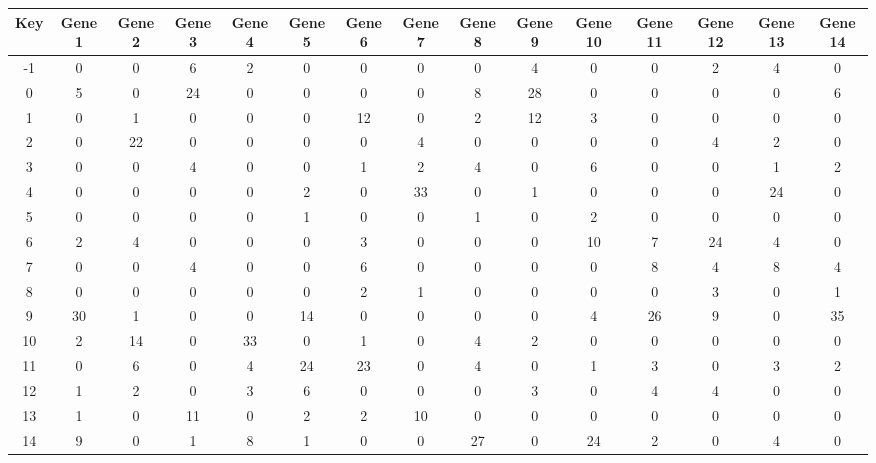 \begin{tabular}{|c|c|c|c|c|c|c|c|c|c|c|c|c|c|c|}
\hline
Key & Gene 1 & Gene 2 & Gene 3 & Gene 4 & Gene 5 & Gene 6 & Gene 7 & Gene 8 & Gene 9 & Gene 10 & Gene 11 & Gene 12 & Gene 13 & Gene 14 \\
\hline
-1 & 0 & 0 & 6 & 2 & 0 & 0 & 0 & 0 & 4 & 0 & 0 & 2 & 4 & 0 \\
0 & 5 & 0 & 24 & 0 & 0 & 0 & 0 & 8 & 28 & 0 & 0 & 0 & 0 & 6 \\
1 & 0 & 1 & 0 & 0 & 0 & 12 & 0 & 2 & 12 & 3 & 0 & 0 & 0 & 0 \\
2 & 0 & 22 & 0 & 0 & 0 & 0 & 4 & 0 & 0 & 0 & 0 & 4 & 2 & 0 \\
3 & 0 & 0 & 4 & 0 & 0 & 1 & 2 & 4 & 0 & 6 & 0 & 0 & 1 & 2 \\
4 & 0 & 0 & 0 & 0 & 2 & 0 & 33 & 0 & 1 & 0 & 0 & 0 & 24 & 0 \\
5 & 0 & 0 & 0 & 0 & 1 & 0 & 0 & 1 & 0 & 2 & 0 & 0 & 0 & 0 \\
6 & 2 & 4 & 0 & 0 & 0 & 3 & 0 & 0 & 0 & 10 & 7 & 24 & 4 & 0 \\
7 & 0 & 0 & 4 & 0 & 0 & 6 & 0 & 0 & 0 & 0 & 8 & 4 & 8 & 4 \\
8 & 0 & 0 & 0 & 0 & 0 & 2 & 1 & 0 & 0 & 0 & 0 & 3 & 0 & 1 \\
9 & 30 & 1 & 0 & 0 & 14 & 0 & 0 & 0 & 0 & 4 & 26 & 9 & 0 & 35 \\
10 & 2 & 14 & 0 & 33 & 0 & 1 & 0 & 4 & 2 & 0 & 0 & 0 & 0 & 0 \\
11 & 0 & 6 & 0 & 4 & 24 & 23 & 0 & 4 & 0 & 1 & 3 & 0 & 3 & 2 \\
12 & 1 & 2 & 0 & 3 & 6 & 0 & 0 & 0 & 3 & 0 & 4 & 4 & 0 & 0 \\
13 & 1 & 0 & 11 & 0 & 2 & 2 & 10 & 0 & 0 & 0 & 0 & 0 & 0 & 0 \\
14 & 9 & 0 & 1 & 8 & 1 & 0 & 0 & 27 & 0 & 24 & 2 & 0 & 4 & 0 \\
\hline
\end{tabular}